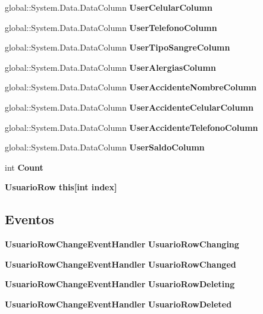 \begin{DoxyCompactItemize}
global\-::\-System.\-Data.\-Data\-Column {\bf User\-Celular\-Column}\hspace{0.3cm}{\ttfamily  [get]}
\item 
global\-::\-System.\-Data.\-Data\-Column {\bf User\-Telefono\-Column}\hspace{0.3cm}{\ttfamily  [get]}
\item 
global\-::\-System.\-Data.\-Data\-Column {\bf User\-Tipo\-Sangre\-Column}\hspace{0.3cm}{\ttfamily  [get]}
\item 
global\-::\-System.\-Data.\-Data\-Column {\bf User\-Alergias\-Column}\hspace{0.3cm}{\ttfamily  [get]}
\item 
global\-::\-System.\-Data.\-Data\-Column {\bf User\-Accidente\-Nombre\-Column}\hspace{0.3cm}{\ttfamily  [get]}
\item 
global\-::\-System.\-Data.\-Data\-Column {\bf User\-Accidente\-Celular\-Column}\hspace{0.3cm}{\ttfamily  [get]}
\item 
global\-::\-System.\-Data.\-Data\-Column {\bf User\-Accidente\-Telefono\-Column}\hspace{0.3cm}{\ttfamily  [get]}
\item 
global\-::\-System.\-Data.\-Data\-Column {\bf User\-Saldo\-Column}\hspace{0.3cm}{\ttfamily  [get]}
\item 
int {\bf Count}\hspace{0.3cm}{\ttfamily  [get]}
\item 
{\bf Usuario\-Row} {\bf this[int index]}\hspace{0.3cm}{\ttfamily  [get]}
\end{DoxyCompactItemize}
\subsection*{Eventos}
\begin{DoxyCompactItemize}
\item 
{\bf Usuario\-Row\-Change\-Event\-Handler} {\bf Usuario\-Row\-Changing}
\item 
{\bf Usuario\-Row\-Change\-Event\-Handler} {\bf Usuario\-Row\-Changed}
\item 
{\bf Usuario\-Row\-Change\-Event\-Handler} {\bf Usuario\-Row\-Deleting}
\item 
{\bf Usuario\-Row\-Change\-Event\-Handler} {\bf Usuario\-Row\-Deleted}
\end{DoxyCompactItemize}
